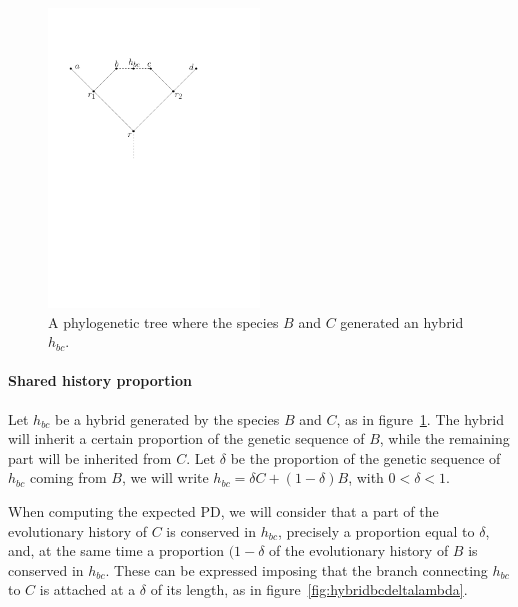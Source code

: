 \documentclass[12pt,a4paper]{report}
\begin{document}
\begin{figure}[h]
	\centering
		\includegraphics[width=0.5\textwidth]{images/hybridbc}
		\caption{A phylogenetic tree where the species $B$ and $C$ generated an hybrid $h_{bc}$.}
		\label{fig:hybridbc}
\end{figure}

\paragraph{Shared history proportion}
Let $h_{bc}$ be a hybrid generated by the species $B$ and $C$, as in figure~\ref{fig:hybridbc}. The hybrid will inherit a certain proportion of the genetic sequence of $B$, while the remaining part will be inherited from $C$. Let $\delta$ be the proportion of the genetic sequence of $h_{bc}$ coming from $B$, we will write $h_{bc}=\delta C + (1-\delta)B$, with $0 < \delta <1$.

When computing the expected PD, we will consider that a part of the evolutionary history of $C$ is conserved in $h_{bc}$, precisely a proportion equal to $\delta$, and, at the same time a proportion $(1-\delta$ of the evolutionary history of $B$ is conserved in $h_{bc}$. These can be expressed imposing that the branch connecting $h_{bc}$ to $C$ is attached at a $\delta$ of its length, as in figure~\ref{fig:hybridbcdeltalambda}.
\end{document}
